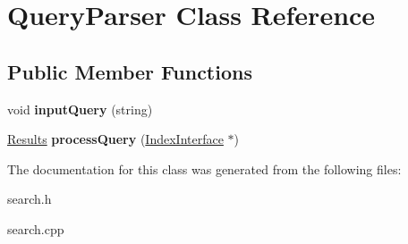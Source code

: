 \hypertarget{classQueryParser}{}\section{Query\+Parser Class Reference}
\label{classQueryParser}
\subsection*{Public Member Functions}
\begin{DoxyCompactItemize}
\item 
void {\bfseries input\+Query} (string)\hypertarget{classQueryParser_a02d12549b88553edbcbd05b5515e80a3}{}\label{classQueryParser_a02d12549b88553edbcbd05b5515e80a3}

\item 
\hyperlink{classResults}{Results} {\bfseries process\+Query} (\hyperlink{classIndexInterface}{Index\+Interface} $\ast$)\hypertarget{classQueryParser_a428555018ee156514760d0a2057c31d0}{}\label{classQueryParser_a428555018ee156514760d0a2057c31d0}

\end{DoxyCompactItemize}


The documentation for this class was generated from the following files\+:\begin{DoxyCompactItemize}
\item 
search.\+h\item 
search.\+cpp\end{DoxyCompactItemize}
